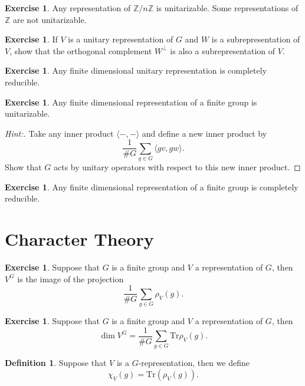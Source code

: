\documentclass[11pt]{article}
\theoremstyle{plain}
\theoremstyle{definition}
\newtheorem{definition}[proposition]{Definition}
\newtheorem{exercise}[proposition]{Exercise}
\theoremstyle{remark}
\begin{document}
\begin{exercise}
Any representation of $\mathbb{Z}/n\mathbb{Z}$ is unitarizable.  Some representations of $\mathbb{Z}$ are not unitarizable.
\end{exercise}

\begin{exercise}
If $V$ is a unitary representation of $G$ and $W$ is a subrepresentation of $V$, show that the orthogonal complement $W^\perp$ is also a subrepresentation of $V$.
\end{exercise}

\begin{exercise}
Any finite dimensional unitary representation is completely reducible.
\end{exercise}

\begin{exercise}
Any finite dimensional representation of a finite group is unitarizable.
\end{exercise}
\begin{proof}[Hint:]
Take any inner product $\langle-,-\rangle$ and define a new inner product by $$\frac{1}{\# G} \sum_{g \in G} \langle gv, gw\rangle.$$  Show that $G$ acts by unitary operators with respect to this new inner product.
\end{proof}

\begin{exercise}
Any finite dimensional representation of a finite group is completely reducible.
\end{exercise}


\section{Character Theory}

\begin{exercise}
Suppose that $G$ is a finite group and $V$ a representation of $G$, then $V^G$ is the image of the projection
$$\frac{1}{\# G}\sum_{g \in G} \rho_V(g).$$
\end{exercise}

\begin{exercise} \label{Invariant-Trace}
Suppose that $G$ is a finite group and $V$ a representation of $G$, then
$$\dim V^G = \frac{1}{\# G} \sum_{g \in G} \mathrm{Tr} \rho_V(g).$$
\end{exercise}

\begin{definition}
Suppose that $V$ is a $G$-representation, then we define $$\chi_V(g) = \mathrm{Tr}(\rho_V(g)).$$
\end{definition}
\end{document}
